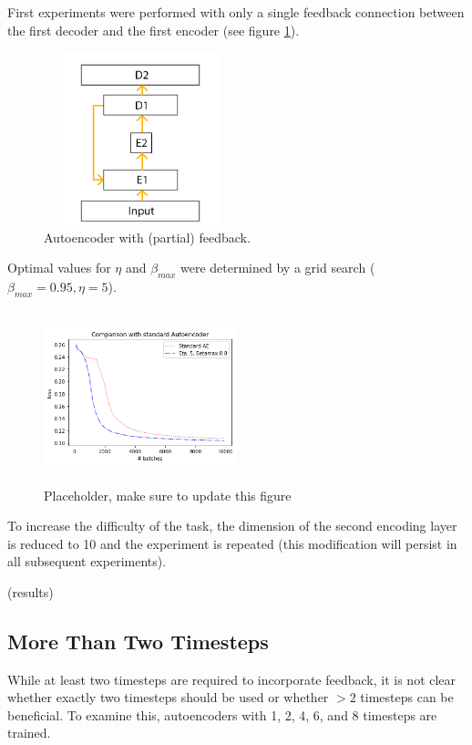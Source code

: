\documentclass{article}
\begin{document}
First experiments were performed with only a single feedback connection between the first decoder and the first encoder (see figure \ref{fig:autoenc}). 

\begin{figure}[H]
      \centering
      \includegraphics[width=0.5\textwidth,height=5cm,keepaspectratio]{img/AutoEnc.png}
      \caption{Autoencoder with (partial) feedback.}
      \label{fig:autoenc}
  \end{figure}
  
Optimal values for $\eta$ and $\beta_{max}$ were determined by a grid search ($\beta_{max}=0.95, \eta=5$).
 \begin{figure}[H]
      \centering
      \includegraphics[width=0.5\textwidth,height=5cm,keepaspectratio]{img/fb_vs_nofb.png}
      \caption{Placeholder, make sure to update this figure}
      \label{fig:fbvsnofb}
  \end{figure}
  
To increase the difficulty of the task, the dimension of the second encoding layer is reduced to 10 and the experiment is repeated (this modification will persist in all subsequent experiments).

(results) 

\subsection{More Than Two Timesteps}
While at least two timesteps are required to incorporate feedback, it is not clear whether exactly two timesteps should be used or whether $>2$ timesteps can be beneficial. To examine this, autoencoders with 1, 2, 4, 6, and 8 timesteps are trained. 
\end{document}
